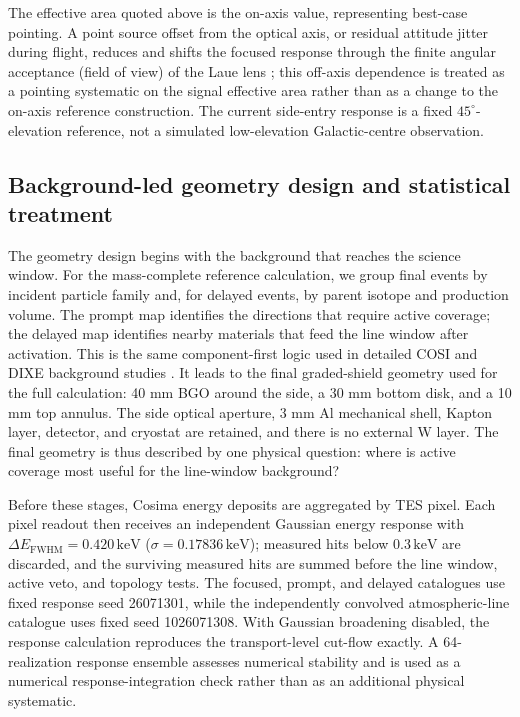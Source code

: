 \documentclass[11pt]{article}
\newcommand{\keV}{\ensuremath{\,\mathrm{keV}}}
\begin{document}
The effective area quoted above is the on-axis value, representing best-case
pointing. A point source offset from the optical axis, or residual attitude
jitter during flight, reduces and shifts the focused response through the finite
angular acceptance (field of view) of the Laue lens
\cite{Barriere2009Laue,Weidenspointner2006MAX}; this off-axis dependence is
treated as a pointing systematic on the signal effective area rather than as a
change to the on-axis reference construction. The current side-entry response
is a fixed $45^\circ$-elevation reference, not a simulated
low-elevation Galactic-centre observation.

\subsection{Background-led geometry design and statistical treatment}
\label{subsec:comparison_hierarchy}

The geometry design begins with the background that reaches the science window.
For the mass-complete reference calculation, we group final events by incident
particle family and, for delayed events, by parent isotope and production volume.
The prompt map identifies the directions that require active coverage; the delayed
map identifies nearby materials that feed the line window after activation. This is
the same component-first logic used in detailed COSI and DIXE background studies
\cite{Gallego2025Balloon,Tian2026DIXE}. It leads to the final graded-shield geometry used for
the full calculation: 40 mm BGO around the side, a 30 mm bottom disk, and a 10 mm
top annulus. The side optical aperture, 3 mm Al mechanical shell, Kapton layer,
detector, and cryostat are retained, and there is no external W layer. The final
geometry is thus described by one physical question: where is active coverage most
useful for the line-window background?

Before these stages, Cosima energy deposits are aggregated by TES pixel. Each
pixel readout then receives an independent Gaussian energy response with
$\Delta E_{\mathrm{FWHM}}=0.420\keV$ ($\sigma=0.17836\keV$); measured hits below
$0.3\keV$ are discarded, and the surviving measured hits are summed before the
line window, active veto, and topology tests. The focused, prompt, and delayed
catalogues use fixed response seed 26071301, while the independently convolved
atmospheric-line catalogue uses fixed seed 1026071308. With Gaussian broadening disabled, the response
calculation reproduces the transport-level cut-flow exactly. A 64-realization
response ensemble assesses numerical stability and is used as a numerical
response-integration check rather than as an additional physical systematic.
\end{document}
